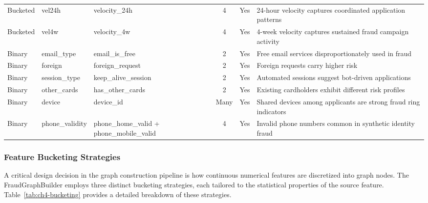 \begin{table}[H]
\begin{tabularx}{\textwidth}{llXccX}
Bucketed & vel24h & velocity\_24h & 4 & Yes & 24-hour velocity captures coordinated application patterns \\
Bucketed & vel4w & velocity\_4w & 4 & Yes & 4-week velocity captures sustained fraud campaign activity \\
\midrule
Binary & email\_type & email\_is\_free & 2 & Yes & Free email services disproportionately used in fraud \\
Binary & foreign & foreign\_request & 2 & Yes & Foreign requests carry higher risk \\
Binary & session\_type & keep\_alive\_session & 2 & Yes & Automated sessions suggest bot-driven applications \\
Binary & other\_cards & has\_other\_cards & 2 & Yes & Existing cardholders exhibit different risk profiles \\
Binary & device & device\_id & Many & Yes & Shared devices among applicants are strong fraud ring indicators \\
Binary & phone\_validity & phone\_home\_valid + phone\_mobile\_valid & 4 & Yes & Invalid phone numbers common in synthetic identity fraud \\
\bottomrule
\end{tabularx}
\end{table}

\subsubsection{Feature Bucketing Strategies}

A critical design decision in the graph construction pipeline is how continuous numerical features are discretized into graph nodes. The FraudGraphBuilder employs three distinct bucketing strategies, each tailored to the statistical properties of the source feature. Table~\ref{tab:ch4-bucketing} provides a detailed breakdown of these strategies.

